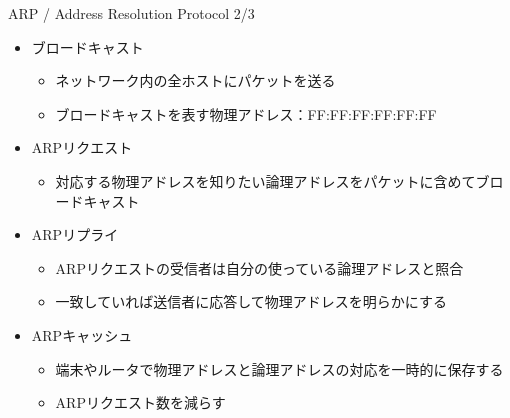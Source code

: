 \documentclass[12pt,aspectratio=169]{beamer}
\begin{document}
\begin{frame}{ARP / Address Resolution Protocol 2/3}

  \begin{itemize}
    \item ブロードキャスト
      \begin{itemize}
        \item ネットワーク内の全ホストにパケットを送る
        \item ブロードキャストを表す物理アドレス：FF:FF:FF:FF:FF:FF
      \end{itemize}
    \item ARPリクエスト
      \begin{itemize}
        \item 対応する物理アドレスを知りたい論理アドレスをパケットに含めてブロードキャスト
      \end{itemize}

    \item ARPリプライ
      \begin{itemize}
        \item ARPリクエストの受信者は自分の使っている論理アドレスと照合
        \item 一致していれば送信者に応答して物理アドレスを明らかにする
      \end{itemize}

    \item ARPキャッシュ
      \begin{itemize}
        \item 端末やルータで物理アドレスと論理アドレスの対応を一時的に保存する
        \item ARPリクエスト数を減らす
      \end{itemize}

  \end{itemize}

\end{frame}
\end{document}
